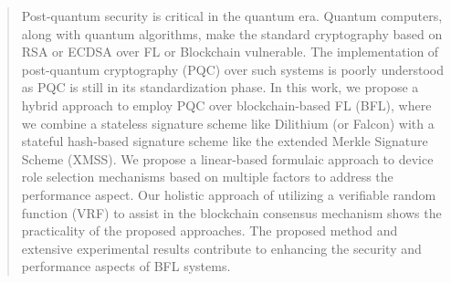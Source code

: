 \begin{abstract}
Post-quantum security is critical 
in the quantum era. 
Quantum computers, along with quantum algorithms, make the standard cryptography based on RSA or ECDSA over FL or Blockchain vulnerable.
The implementation of post-quantum cryptography (PQC) over such systems is poorly understood as PQC is still in its standardization phase.
In this work, we propose a hybrid approach to employ PQC over blockchain-based FL (BFL), where we combine a stateless signature scheme like Dilithium (or Falcon) with a stateful hash-based signature scheme like the extended Merkle Signature Scheme (XMSS).
We propose a linear-based formulaic approach to device role selection mechanisms based on multiple factors to address the performance aspect.
Our holistic approach of utilizing a verifiable random function (VRF) to assist in the blockchain consensus mechanism shows the practicality of the proposed approaches.
The proposed method and extensive experimental results contribute to enhancing the security and performance aspects of BFL systems.





%  


\end{abstract}
